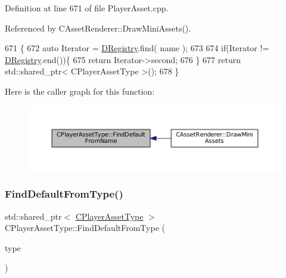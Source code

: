 Definition at line 671 of file Player\+Asset.\+cpp.



Referenced by C\+Asset\+Renderer\+::\+Draw\+Mini\+Assets().


\begin{DoxyCode}
671                                                                                             \{
672     \textcolor{keyword}{auto} Iterator = \hyperlink{classCPlayerAssetType_a24f4ccd06fbddacc936e31a2f1f12ed5}{DRegistry}.find( name );
673     
674     \textcolor{keywordflow}{if}(Iterator != \hyperlink{classCPlayerAssetType_a24f4ccd06fbddacc936e31a2f1f12ed5}{DRegistry}.end())\{
675         \textcolor{keywordflow}{return} Iterator->second;    
676     \}
677     \textcolor{keywordflow}{return} std::shared\_ptr< CPlayerAssetType >();
678 \}
\end{DoxyCode}
Here is the caller graph for this function\+:\nopagebreak
\begin{figure}[H]
\begin{center}
\leavevmode
\includegraphics[width=350pt]{classCPlayerAssetType_a7e1684eac4efaf7afe9a5c15af262b33_icgraph}
\end{center}
\end{figure}
\hypertarget{classCPlayerAssetType_a7b3c6682f379bfcd974342329eaabab9}{}\label{classCPlayerAssetType_a7b3c6682f379bfcd974342329eaabab9} 
\subsubsection{\texorpdfstring{Find\+Default\+From\+Type()}{FindDefaultFromType()}}
{\footnotesize\ttfamily std\+::shared\+\_\+ptr$<$ \hyperlink{classCPlayerAssetType}{C\+Player\+Asset\+Type} $>$ C\+Player\+Asset\+Type\+::\+Find\+Default\+From\+Type (\begin{DoxyParamCaption}\item[{\hyperlink{GameDataTypes_8h_a5600d4fc433b83300308921974477fec}{E\+Asset\+Type}}]{type }\end{DoxyParamCaption})\hspace{0.3cm}{\ttfamily [static]}}



